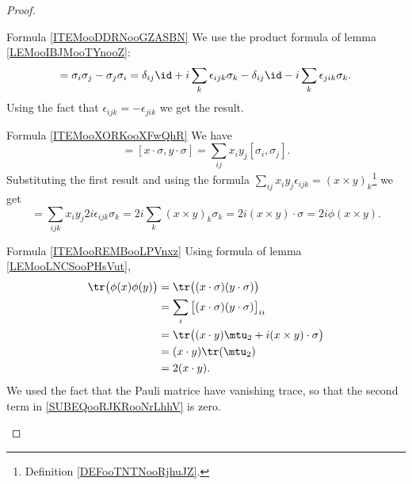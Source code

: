 \begin{proof}
    \begin{subproof}
        \item[Formula \ref{ITEMooDDRNooGZASBN}]
            We use the product formula of lemma \ref{LEMooIBJMooTYnooZ}:
            \begin{equation}
                [\sigma_i,\sigma_j]=\sigma_i\sigma_j-\sigma_j\sigma_i=\delta_{ij}\id+i\sum_k\epsilon_{ijk}\sigma_k-\delta_{ij}\id-i\sum_k\epsilon_{jik}\sigma_k.
            \end{equation}
            Using the fact that \( \epsilon_{ijk}=-\epsilon_{jik}\) we get the result.
        \item[Formula \ref{ITEMooXORKooXFwQhR}]
            We have
            \begin{equation}
                [\phi(x),\phi(y)]=[x\cdot \sigma,y\cdot \sigma]=\sum_{ij}x_iy_j[\sigma_i,\sigma_j].
            \end{equation}
            Substituting the first result and using the formula \( \sum_{ij}x_iy_j\epsilon_{ijk}=(x\times y)_k\)\footnote{Definition \ref{DEFooTNTNooRjhuJZ}.} we get
            \begin{equation}
                [\phi(x),\phi(y)] = \sum_{ijk}x_iy_j2i\epsilon_{ijk}\sigma_k=2i\sum_k(x\times y)_k\sigma_k=2i(x\times y)\cdot \sigma=2i\phi(x\times y).
            \end{equation}
        \item[Formula \ref{ITEMooREMBooLPVnxz}]
            Using formula of lemma \ref{LEMooLNCSooPHsVut},
            \begin{subequations}
                \begin{align}
                    \tr\big( \phi(x)\phi(y) \big)&=\tr\big( (x\cdot \sigma)(y\cdot \sigma) \big)\\
                    &=\sum_i\big[ (x\cdot \sigma)(y\cdot \sigma) \big]_{ii}\\
                    &=\tr\big( (x\cdot y)\mtu_2+i(x\times y)\cdot \sigma \big)      \label{SUBEQooRJKRooNrLhhV}\\
                    &=(x\cdot y)\tr(\mtu_2)\\
                    &=2(x\cdot y).
                \end{align}
            \end{subequations}
            We used the fact that the Pauli matrice have vanishing trace, so that the second term in \eqref{SUBEQooRJKRooNrLhhV} is zero.
    \end{subproof}
\end{proof}

